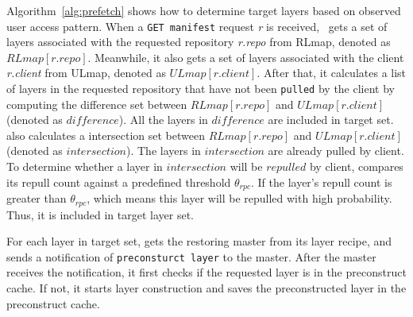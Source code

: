 Algorithm~\ref{alg:prefetch} shows how to determine target layers 
based on observed user access pattern.
When a \texttt{GET manifest} request \emph{r} is received,
\sysname~gets a set of layers associated with the requested repository \emph{r.repo} from RLmap, 
denoted as $RLmap[r.repo]$.
Meanwhile, it also gets a set of layers associated with the client \emph{r.client} from ULmap,
denoted as $ULmap[r.client]$.
After that, it calculates a list of layers in the requested repository 
that have not been \texttt{pulled} by the client by
computing the difference set between $RLmap[r.repo]$ and $ULmap[r.client]$ (denoted as $difference$).
All the layers in $difference$ are included in target set.
\sysname also calculates a intersection set between 
$RLmap[r.repo]$ and $ULmap[r.client]$ (denoted as $intersection$).
The layers in $intersection$ are already pulled by client.
To determine whether a layer in $intersection$ will be
$repulled$ by client,
\sysname compares its repull count against a predefined threshold $\theta_{rpc}$.
If the layer's repull count is greater than $\theta_{rpc}$,
which means this layer will be repulled with high probability.
Thus, it is included in target layer set.

For each layer in target set, 
\sysname gets the restoring master from its layer recipe,
and sends a notification of \texttt{preconsturct layer} to the master.
After the master receives the notification,
it first checks if the requested layer is in the preconstruct cache.
If not, 
it starts layer construction and saves the preconstructed layer in the preconstruct cache.
 
%
